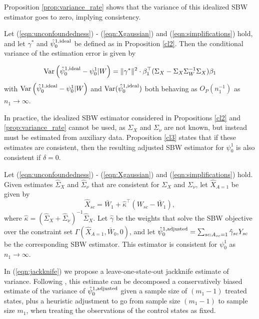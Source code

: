 Proposition \ref{prop:variance_rate} shows that the variance of this idealized SBW estimator goes to zero, implying consistency. 
\begin{proposition}\label{prop:variance_rate}
Let (\ref{eqn:unconfoundedness}) - (\ref{eqn:Xgaussian}) and (\ref{eqn:simplifications}) hold, and let $\gamma^*$ and $\hat{\psi}_0^{1, \textup{ideal}}$ be defined as in Proposition \ref{cl2}. Then the conditional variance of the estimation error is given by

\begin{align*}
\operatorname{Var}\left( \hat{\psi}_0^{1, \textup{ideal}} - \psi_0^1| W\right)  = \|\gamma^*\|^2 \cdot \beta_1^\top (\Sigma_{X} - \Sigma_{X}\Sigma_{W}^{-1}\Sigma_{X})\beta_1
\end{align*}
with $\operatorname{Var}\left( \hat{\psi}_0^{1, \textup{ideal}} - \psi_0^1| W\right)$ and $\operatorname{Var}(\hat{\psi}_0^{1,\textup{ideal}})$ both behaving as $O_P(n_1^{-1})$ as $n_1 \rightarrow \infty$.
\end{proposition}

In practice, the idealized SBW estimator considered in Propositions \ref{cl2} and \ref{prop:variance_rate} cannot be used, as $\Sigma_X$ and $\Sigma_{\nu}$ are not known, but instead must be estimated from auxiliary data. Proposition \ref{cl3} states that if these estimates are consistent, then the resulting adjusted SBW estimator for $\psi_0^1$ is also consistent if $\delta = 0$.

\begin{proposition}\label{cl3}
Let (\ref{eqn:unconfoundedness}) - (\ref{eqn:Xgaussian}) and (\ref{eqn:simplifications}) hold. Given estimates $\hat{\Sigma}_X$ and $\hat{\Sigma}_\nu$ that are consistent for $\Sigma_X$ and $\Sigma_\nu$, let $\hat{X}_{A=1}$ be given by 
\[ \hat{X}_{sc} = \bar{W}_1 + \hat{\kappa}^\top(W_{sc} - \bar{W}_1), \]
where $\hat{\kappa} = (\hat{\Sigma}_X + \hat{\Sigma}_{\nu})^{-1} \hat{\Sigma}_X$. Let $\hat{\gamma}$ be the weights that solve the SBW objective over the constraint set $\Gamma(\hat{X}_{A=1}, \bar{W}_0, 0)$, and let $\hat{\psi}^{1, \textup{adjusted}}_0 = \sum_{sc: A_{sc} = 1} \hat{\gamma}_{sc} Y_{sc}$ be the corresponding SBW estimator. This estimator is consistent for $\psi_0^1$ as $n_1 \to \infty$.
\end{proposition}

In (\ref{eqn:jackknife}) we propose a leave-one-state-out jackknife estimate of variance. Following \cite{efron1981jackknife}, this estimate can be decomposed a conservatively biased estimate of the variance of $\hat{\psi}_0^{1, \textup{adjusted}}$ given a sample size of $(m_1-1)$ treated states, plus a heuristic adjustment to go from sample size $(m_1-1)$ to sample size $m_1$, when treating the observations of the control states as fixed.

